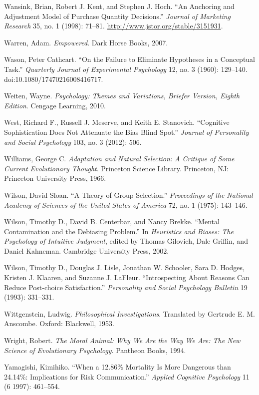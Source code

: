 {
 Wansink, Brian, Robert J. Kent, and Stephen J. Hoch.
``An Anchoring and Adjustment Model of Purchase
Quantity Decisions.'' \textit{Journal of Marketing
Research} 35, no. 1 (1998): 71--81.
\url{http://www.jstor.org/stable/3151931}.}

{
 Warren, Adam. \textit{Empowered}. Dark Horse Books, 2007.}

{
 Wason, Peter Cathcart. ``On the Failure to
Eliminate Hypotheses in a Conceptual Task.''
\textit{Quarterly Journal of Experimental Psychology} 12, no. 3 (1960):
129--140. doi:10.1080/17470216008416717.}

{
 Weiten, Wayne. \textit{Psychology: Themes and Variations, Briefer
Version, Eighth Edition}. Cengage Learning, 2010.}

{
 West, Richard F., Russell J. Meserve, and Keith E. Stanovich.
``Cognitive Sophistication Does Not Attenuate the Bias
Blind Spot.'' \textit{Journal of Personality and
Social Psychology} 103, no. 3 (2012): 506.}

{
 Williams, George C. \textit{Adaptation and Natural Selection: A
Critique of Some Current Evolutionary Thought}. Princeton Science
Library. Princeton, NJ: Princeton University Press, 1966.}

{
 Wilson, David Sloan. ``A Theory of Group
Selection.'' \textit{Proceedings of the National
Academy of Sciences of the United States of America} 72, no. 1 (1975):
143--146.}

{
 Wilson, Timothy D., David B. Centerbar, and Nancy Brekke.
``Mental Contamination and the Debiasing
Problem.'' In \textit{Heuristics and Biases: The
Psychology of Intuitive Judgment}, edited by Thomas Gilovich, Dale
Griffin, and Daniel Kahneman. Cambridge University Press, 2002.}

{
 Wilson, Timothy D., Douglas J. Lisle, Jonathan W. Schooler, Sara
D. Hodges, Kristen J. Klaaren, and Suzanne J. LaFleur.
``Introspecting About Reasons Can Reduce Post-choice
Satisfaction.'' \textit{Personality and Social
Psychology Bulletin} 19 (1993): 331--331.}

{
 Wittgenstein, Ludwig. \textit{Philosophical Investigations}.
Translated by Gertrude E. M. Anscombe. Oxford: Blackwell, 1953.}

{
 Wright, Robert. \textit{The Moral Animal: Why We Are the Way We
Are: The New Science of Evolutionary Psychology}. Pantheon Books,
1994.}

{
 Yamagishi, Kimihiko. ``When a 12.86\% Mortality
Is More Dangerous than 24.14\%: Implications for Risk
Communication.'' \textit{Applied Cognitive
Psychology} 11 (6 1997): 461--554.}

